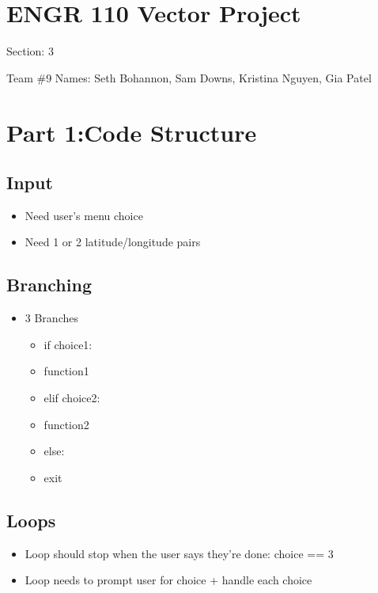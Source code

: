 \documentclass[11pt]{article}
\date{\today}
\title{}
\begin{document}
\tableofcontents

\section{ENGR 110 Vector Project}
\label{sec:orgd0fbdbd}

Section: 3

Team \#9
Names: Seth Bohannon, Sam Downs, Kristina Nguyen, Gia Patel

\section{Part 1:Code Structure}
\label{sec:org4fc02d6}
\subsection{Input}
\label{sec:orgb84237e}
\begin{itemize}
\item Need user's menu choice
\item Need 1 or 2 latitude/longitude pairs
\end{itemize}

\subsection{Branching}
\label{sec:org94c58a2}
\begin{itemize}
\item 3 Branches
\begin{itemize}
\item if choice1:
\item function1
\item elif choice2:
\item function2
\item else:
\item exit
\end{itemize}
\end{itemize}

\subsection{Loops}
\label{sec:orga21996d}
\begin{itemize}
\item Loop should stop when the user says they're done: choice == 3
\item Loop needs to prompt user for choice + handle each choice
\end{itemize}
\end{document}
